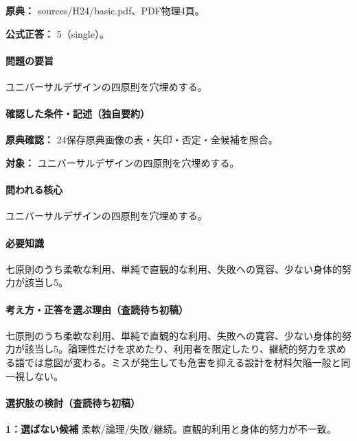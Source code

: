 \noindent\textbf{原典：} sources/H24/basic.pdf、PDF物理4頁。

\textbf{公式正答：} 5（single）。

\paragraph{問題の要旨} ユニバーサルデザインの四原則を穴埋めする。

\paragraph{確認した条件・記述（独自要約）}\mbox{}\par

\noindent\textbf{原典確認：} 24保存原典画像の表・矢印・否定・全候補を照合。\par

\noindent\textbf{対象：} ユニバーサルデザインの四原則を穴埋めする。\par

\paragraph{問われる核心} ユニバーサルデザインの四原則を穴埋めする。

\paragraph{必要知識} 七原則のうち柔軟な利用、単純で直観的な利用、失敗への寛容、少ない身体的努力が該当し5。

\paragraph{考え方・正答を選ぶ理由（査読待ち初稿）} 七原則のうち柔軟な利用、単純で直観的な利用、失敗への寛容、少ない身体的努力が該当し5。論理性だけを求めたり、利用者を限定したり、継続的努力を求める語では意図が変わる。ミスが発生しても危害を抑える設計を材料欠陥一般と同一視しない。

\paragraph{選択肢の検討（査読待ち初稿）}\mbox{}\par

\noindent\textbf{1：選ばない候補} 柔軟/論理/失敗/継続。直観的利用と身体的努力が不一致。\par

